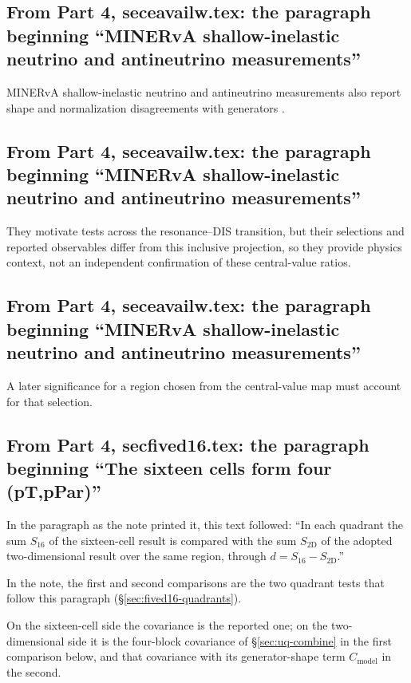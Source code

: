 \subsection{From Part 4, seceavailw.tex: the paragraph beginning ``MINERvA shallow-inelastic neutrino and antineutrino measurements''}
MINERvA shallow-inelastic neutrino and antineutrino measurements also report shape and normalization disagreements with generators \cite{MINERvA:2026sis}.

\subsection{From Part 4, seceavailw.tex: the paragraph beginning ``MINERvA shallow-inelastic neutrino and antineutrino measurements''}
They motivate tests across the resonance--DIS transition, but their selections and reported observables differ from this inclusive projection, so they provide physics context, not an independent confirmation of these central-value ratios.

\subsection{From Part 4, seceavailw.tex: the paragraph beginning ``MINERvA shallow-inelastic neutrino and antineutrino measurements''}
A later significance for a region chosen from the central-value map must account for that selection.

\subsection{From Part 4, secfived16.tex: the paragraph beginning ``The sixteen cells form four (pT,pPar)''}
In the paragraph as the note printed it, this text followed: ``In each quadrant the sum $S_{16}$ of the sixteen-cell result is compared with the sum $S_{\mathrm{2D}}$ of the adopted two-dimensional result over the same region, through $d=S_{16}-S_{\mathrm{2D}}$.''\par
In the note, the first and second comparisons are the two quadrant tests that follow this paragraph (\S\ref{sec:fived16-quadrants}).\par
On the sixteen-cell side the covariance is the reported one; on the two-dimensional side it is the four-block covariance of \S\ref{sec:uq-combine} in the first comparison below, and that covariance with its generator-shape term $C_{\mathrm{model}}$ in the second.

